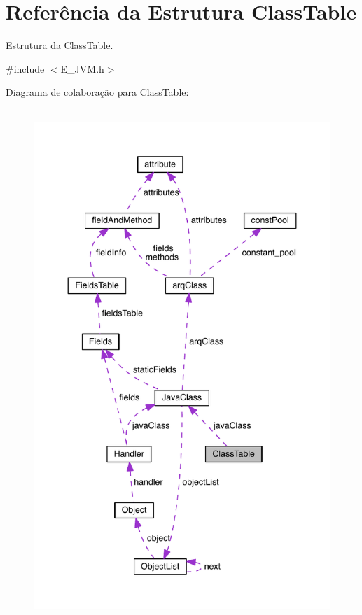 \hypertarget{struct_class_table}{}\section{Referência da Estrutura Class\+Table}
\label{struct_class_table}


Estrutura da \hyperlink{struct_class_table}{Class\+Table}.  




{\ttfamily \#include $<$E\+\_\+\+J\+V\+M.\+h$>$}



Diagrama de colaboração para Class\+Table\+:\nopagebreak
\begin{figure}[H]
\begin{center}
\leavevmode
\includegraphics[height=550pt]{struct_class_table__coll__graph}
\end{center}
\end{figure}
